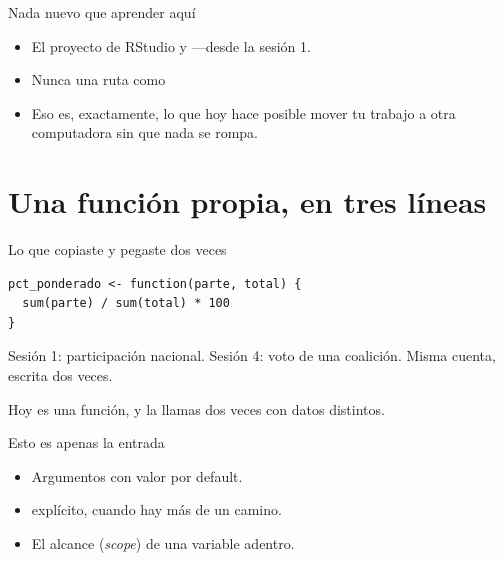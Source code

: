 \begin{frame}{Nada nuevo que aprender aquí}
  \vspace{0.3em}
  \begin{itemize}\setlength{\itemsep}{0.85em}
    \item<1-> El proyecto de RStudio y  —desde la sesión 1.
    \item<2-> Nunca una ruta como 
    \item<3-> Eso es, exactamente, lo que hoy hace posible mover tu trabajo
          a otra computadora sin que nada se rompa.
  \end{itemize}

  \vspace{1.1em}
\end{frame}

\section{Una función propia, en tres líneas}

\begin{frame}[fragile]{Lo que copiaste y pegaste dos veces}
\begin{lstlisting}
pct_ponderado <- function(parte, total) {
  sum(parte) / sum(total) * 100
}
\end{lstlisting}

  \vspace{0.7em}
  Sesión 1: participación nacional. Sesión 4: voto de una coalición.
  Misma cuenta, escrita dos veces.

  \vspace{0.6em}
  Hoy es una función, y la llamas dos veces con datos distintos.
\end{frame}

\begin{frame}{Esto es apenas la entrada}
  \vspace{0.3em}
  \begin{itemize}\setlength{\itemsep}{0.85em}
    \item<1-> Argumentos con valor por \ac{default}.
    \item<2->  explícito, cuando hay más de un camino.
    \item<3-> El \ac{alcance} (\textit{scope}) de una variable adentro.
  \end{itemize}

  \vspace{1.1em}
\end{frame}

